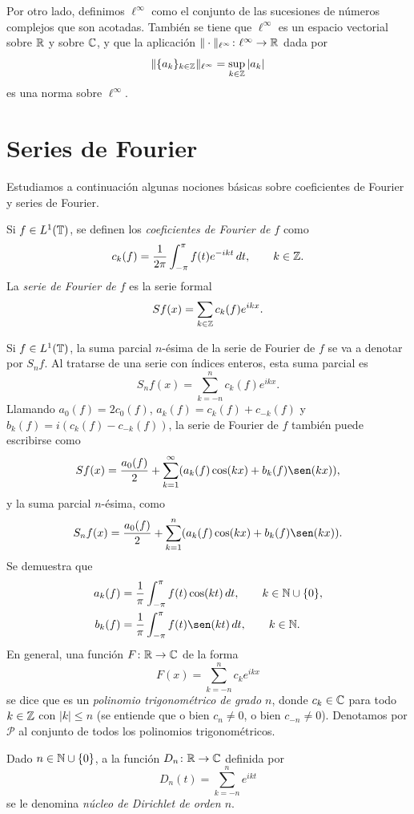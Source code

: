 \documentclass[a4paper, 12pt]{book}
\begin{document}
Por otro lado, definimos $\ell^\infty$ como el conjunto de las sucesiones de números complejos que son acotadas. También se tiene que $\ell^\infty$ es un espacio vectorial sobre $\mathbb R$ y sobre $\mathbb C$, y que la aplicación $\|\cdot\|_{\ell^\infty} \colon \ell^\infty \to \mathbb R$ dada por
\[\|\{a_k\}_{k\in\mathbb Z}\|_{\ell^\infty} = \sup_{k\in\mathbb Z} |a_k|\]
es una norma sobre $\ell^\infty$.

\section{Series de Fourier}

Estudiamos a continuación algunas nociones básicas sobre coeficientes de Fourier y series de Fourier.

\begin{definition}
    Si $f \in L^1(\mathbb T)$, se definen los \emph{coeficientes de Fourier de $f$} como
    \[c_k(f) = \frac{1}{2\pi}\int_{-\pi}^{\pi} f(t)e^{-ikt} \, dt, \qquad k \in \mathbb Z.\]
    La \emph{serie de Fourier de $f$} es la serie formal
    \[Sf(x) = \sum_{ k \in \mathbb Z} c_k(f)e^{ikx}.\]
\end{definition}

Si $f \in L^1(\mathbb T)$, la suma parcial $n$-ésima de la serie de Fourier de $f$ se va a denotar por $S_nf$. Al tratarse de una serie con índices enteros, esta suma parcial es
\[S_nf(x) = \sum_{k=-n}^n c_k(f)e^{ikx}.\]
Llamando $a_0(f) = 2c_0(f)$, $a_k(f) = c_k(f)+c_{-k}(f)$ y $b_k(f) = i(c_k(f)-c_{-k}(f))$, la serie de Fourier de $f$ también puede escribirse como
\[Sf(x) = \frac{a_0(f)}{2}+\sum_{k=1}^\infty (a_k(f)\cos(kx)+b_k(f)\sen(kx)),\]
y la suma parcial $n$-ésima, como
\[S_nf(x) = \frac{a_0(f)}{2}+\sum_{k=1}^{n}(a_k(f)\cos(kx)+b_k(f)\sen(kx)).\]
Se demuestra que
\begin{align*}
    a_k(f) &= \frac{1}{\pi}\integral{-\pi}{\pi}{f(t)\cos(kt)}, \qquad k \in \N\cup\{0\}, \\
    b_k(f) &= \frac{1}{\pi}\integral{-\pi}{\pi}{f(t)\sen(kt)}, \qquad k \in \N.
\end{align*}
En general, una función $F \colon \mathbb R \to \mathbb C$ de la forma
\[F(x) = \sum_{k=-n}^n c_ke^{ikx}\]
se dice que es un \emph{polinomio trigonométrico de grado $n$}, donde $c_k \in \mathbb C$ para todo $k \in \mathbb Z$ con $|k| \leq n$ (se entiende que o bien $c_n \neq 0$, o bien $c_{-n}\neq 0$). Denotamos por $\mathcal{P}$ al conjunto de todos los polinomios trigonométricos.

\begin{definition}
    Dado $n \in \mathbb N \cup \{0\}$, a la función $D_n \colon \mathbb R \to \mathbb C$ definida por
    \[D_n(t) = \sum_{k=-n}^n e^{ikt}\]
    se le denomina \emph{núcleo de Dirichlet de orden $n$}.
\end{definition}
\end{document}
